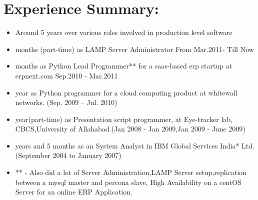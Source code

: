 \section {Experience Summary:}
	\begin{itemize}
		\item Around 5 years over various roles involved in production level software
         
		\item  months (part-time) as LAMP Server Administrator From Mar.2011- Till Now

		\item  months as Python Lead Programmer** for a saas-based erp startup at erpnext.com Sep.2010 - Mar.2011

		\item  year as Python programmer for a cloud computing product at whitewall networks. (Sep. 2009 – Jul. 2010)

		\item  year(part-time) as Presentation script programmer, at Eye-tracker lab, CBCS,University of Allahabad.(Jan 2008 - Jan 2009,Jan 2009 - June 2009)

		\item  years and 5 months as an System Analyst in IBM Global Services India* Ltd.(September 2004 to January 2007)

		\item ** - Also did a lot of Server Administration,LAMP Server setup,replication between a mysql master and percona slave, High Availability on a centOS Server for an online ERP Application.
	\end{itemize}